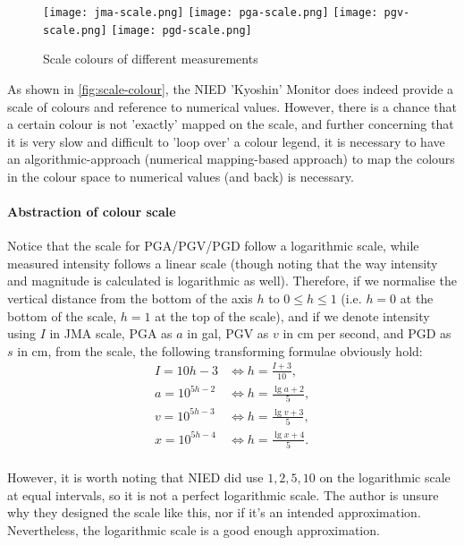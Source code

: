 \begin{figure}[htp]
    \centering
    \texttt{[image: jma-scale.png]}
    \texttt{[image: pga-scale.png]}
    \texttt{[image: pgv-scale.png]}
    \texttt{[image: pgd-scale.png]}
    \caption{Scale colours of different measurements}
    \label{fig:scale-colour}
\end{figure}

As shown in \autoref{fig:scale-colour}, the NIED 'Kyoshin' Monitor does indeed provide a scale of colours and reference to numerical values. However, there is a chance that a certain colour is not 'exactly' mapped on the scale, and further concerning that it is very slow and difficult to 'loop over' a colour legend, it is necessary to have an algorithmic-approach (numerical mapping-based approach) to map the colours in the colour space to numerical values (and back) is necessary.

\paragraph{Abstraction of colour scale}

Notice that the scale for PGA/PGV/PGD follow a logarithmic scale, while measured intensity follows a linear scale (though noting that the way intensity and magnitude is calculated is logarithmic as well). Therefore, if we normalise the vertical distance from the bottom of the axis \(h\) to \(0 \leq h \leq 1\) (i.e. \(h = 0\) at the bottom of the scale, \(h = 1\) at the top of the scale), and if we denote intensity using \(I\) in JMA scale, PGA as \(a\) in gal, PGV as \(v\) in cm per second, and PGD as \(s\) in cm, from the scale, the following transforming formulae obviously hold:
\begin{align*}
    I  = 10h - 3     & \iff h      = \frac{I + 3}{10}, \\
    a  = 10^{5h - 2} & \iff h  = \frac{\lg a + 2}{5},  \\
    v  = 10^{5h - 3} & \iff h  = \frac{\lg v + 3}{5},  \\
    x  = 10^{5h - 4} & \iff h  = \frac{\lg x + 4}{5}.  \\
\end{align*}

However, it is worth noting that NIED did use \(1, 2, 5, 10\) on the logarithmic scale at equal intervals, so it is not a perfect logarithmic scale. The author is unsure why they designed the scale like this, nor if it's an intended approximation. Nevertheless, the logarithmic scale is a good enough approximation.

